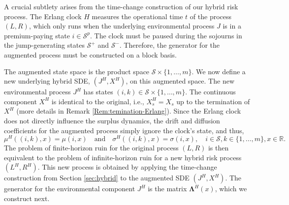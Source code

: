 \documentclass[11pt]{article}
\numberwithin{table}{section}
\numberwithin{figure}{section}
\numberwithin{equation}{section}
\newcommand{\1}{{\mathbf 1}}
\newcommand{\0}{\mat{0}}
\begin{document}
A crucial subtlety arises from the time-change construction of our hybrid risk process. The Erlang clock \(H\) measures the operational time \(t\) of the process \((L,R)\), which only runs when the underlying environmental process \(J\) is in a premium-paying state \(i \in \mathcal{S}^p\). The clock must be paused during the sojourns in the jump-generating states \(\mathcal{S}^+\) and \(\mathcal{S}^-\). Therefore, the generator for the augmented process must be constructed on a block basis.

The augmented state space is the product space \(\mathcal{S} \times \{1, \dots, m\}\). We now define a new underlying hybrid SDE, \((J^H, X^H)\), on this augmented space. The new environmental process \(J^H\) has states \((i,k) \in \mathcal{S} \times \{1, \dots, m\}\). The continuous component \(X^H\) is identical to the original, i.e., \(X^H_s=X_s\) up to the termination of $X^H$ (more details in Remark \ref{Rem:temination-Erlang}). Since the Erlang clock does not directly influence the surplus dynamics, the drift and diffusion coefficients for the augmented process simply ignore the clock's state, and thus,
\[
\mu^H((i,k), x) = \mu(i,x) \quad \text{and} \quad \sigma^H((i,k), x) = \sigma(i,x),\quad i\in\mathcal{S}, k\in \{1, \dots, m\}, x\in\mathds{R}.
\]
The problem of finite-horizon ruin for the original process \((L,R)\) is then equivalent to the problem of infinite-horizon ruin for a new hybrid risk process \((L^H, R^H)\). This new process is obtained by applying the time-change construction from Section \ref{sec:hybrid} to the augmented SDE \((J^H, X^H)\). The generator for the environmental component \(J^H\) is the matrix \(\bm{\Lambda}^H(x)\), which we construct next.
\end{document}

